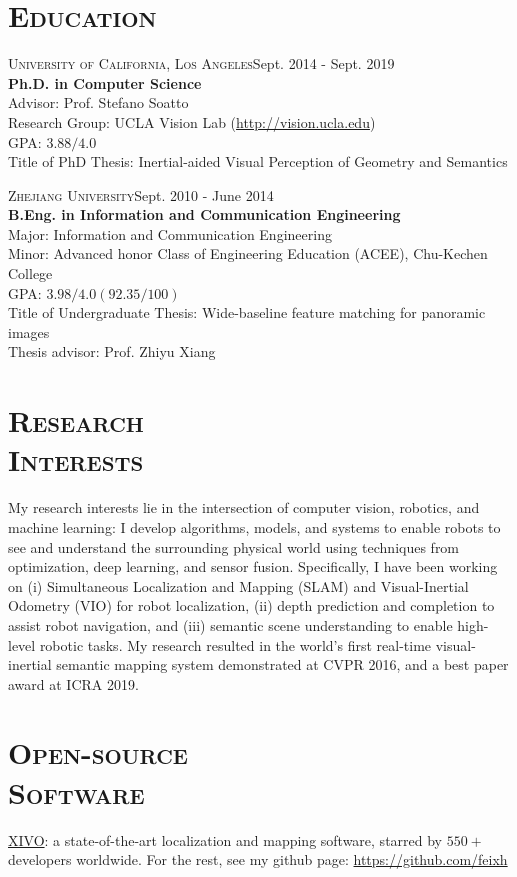 \documentclass[margin, line, 10pt]{res} %
\begin{document}
\begin{resume}

\section{\textsc{Education}}
\textsc{University of California, Los Angeles}\hfill{Sept. 2014 - Sept. 2019}\\
{\bf Ph.D. in Computer Science}\\
Advisor: Prof. Stefano Soatto\\
Research Group: UCLA Vision Lab (\url{http://vision.ucla.edu})\\
GPA: $3.88/4.0$ \\
Title of PhD Thesis: Inertial-aided Visual Perception of Geometry and Semantics

\textsc{Zhejiang University}\hfill{Sept. 2010 - June 2014}\\
{\bf B.Eng. in Information and Communication Engineering}\\
Major: Information and Communication Engineering\\
Minor: Advanced honor Class of Engineering Education (ACEE), Chu-Kechen College\\
GPA: $3.98/4.0 (92.35/100)$\\
Title of Undergraduate Thesis: Wide-baseline feature matching for panoramic images\\
Thesis advisor: Prof. Zhiyu Xiang

\section{\textsc{Research\\Interests}}
My research interests lie in the intersection of computer vision, robotics, and machine learning: I develop algorithms, models, and systems to enable robots to see and understand the surrounding physical world using techniques from optimization, deep learning, and sensor fusion. Specifically, I have been working on (i) Simultaneous Localization and Mapping (SLAM) and Visual-Inertial Odometry (VIO) for robot localization, (ii) depth prediction and completion to assist robot navigation, and (iii) semantic scene understanding to enable high-level robotic tasks. My research resulted in the world's first real-time visual-inertial semantic mapping system demonstrated at CVPR 2016, and a best paper award at ICRA 2019.

\section{\textsc{Open-source\\Software}}
\href{https://github.com/ucla-vision/xivo}{XIVO}: a state-of-the-art localization and mapping software, starred by $550+$ developers worldwide.
For the rest, see my github page: \url{https://github.com/feixh}


\end{resume}
\end{document}
